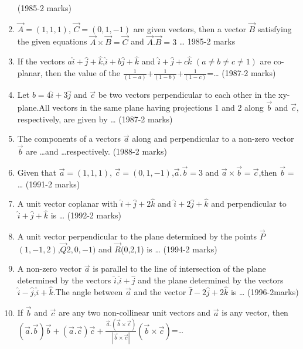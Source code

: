 \documentclass[journal]{IEEEtran}
\numberwithin{equation}{enumi}
\numberwithin{figure}{enumi}
\begin{document}
\begin{enumerate}
\hfill{(1985-2 marks)}
\item $\vec{A}=(1,1,1)$, $\vec{C}=(0,1,-1)$ are given vectors, then a vector $\vec{B}$ satisfying the given equations $\vec{A}\times\vec{B}=\vec{C}$ and $\vec{A}.\vec{B}=3$ \dots
\hfill{1985-2 marks}
\item If the vectors $a\hat{i}+\hat{j}+\hat{k}$,$\hat{i}+b\hat{j}+\hat{k}$ and $\hat{i}+\hat{j}+c\hat{k}$ $(a\neq b\neq c\neq 1)$ are co-planar, then the value of the $\frac{1}{(1-a)}$+$\frac{1}{(1-b)}$+$\frac{1}{(1-c)}$=\dots
\hfill{(1987-2 marks)}
\item Let $b=4\hat{i}+3\hat{j}$ and $\vec{c}$ be two vectors perpendicular to each other in the xy-plane.All vectors in the same plane having projections 1 and 2 along $\vec{b}$ and $\vec{c}$, respectively, are given by \dots
\hfill{(1987-2 marks)}
\item The components of a vectors $\vec{a}$ along and  perpendicular to a non-zero vector $\vec{b}$ are \dots and \dots respectively.
\hfill{(1988-2 marks)}
\item Given that $\vec{a}=(1,1,1)$, $\vec{c}=(0,1,-1)$,$\vec{a}.\vec{b}=3$ and $\vec{a}\times\vec{b}=\vec{c}$,then $\vec{b}=$ \dots
\hfill{(1991-2 marks)}
\item A unit vector coplanar with $\hat{i}+\hat{j}+2\hat{k}$ and $\hat{i}+2\hat{j}+\hat{k}$ and perpendicular to $\hat{i}+\hat{j}+\hat{k}$ is \dots
\hfill{(1992-2 marks)}
\item A unit vector perpendicular to the plane determined by the points $\vec{P}$$(1,-1,2)$,$\vec{Q}2,0,-1)$ and $\vec{R}$(0,2,1) is \dots
\hfill{(1994-2 marks)}
\item A non-zero vector $\vec{a}$ is parallel to the line of intersection of the plane determined by the vectors $\hat{i}$,$\hat{i}+\hat{j}$ and the plane determined by the vectors $\hat{i}-\hat{j}$,$\hat{i}+\hat{k}$.The angle between $\vec{a}$ and the vector $\hat{I}-2\hat{j}+2\hat{k}$ is \dots
\hfill{(1996-2marks)}
\item If $\vec{b}$ and $\vec{c}$ are any two non-collinear unit vectors and $\vec{a}$ is any vector, then $(\vec{a}.\vec{b})\vec{b}+(\vec{a}.\vec{c})\vec{c}+\frac{\vec{a}.(\vec{b}\times\vec{c})}{|\vec{b}\times\vec{c}|}(\vec{b}\times\vec{c})$=\dots

\end{enumerate}
\end{document}
